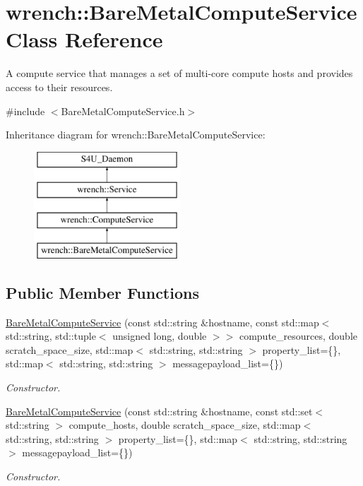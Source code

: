 \hypertarget{classwrench_1_1_bare_metal_compute_service}{}\section{wrench\+:\+:Bare\+Metal\+Compute\+Service Class Reference}
\label{classwrench_1_1_bare_metal_compute_service}


A compute service that manages a set of multi-\/core compute hosts and provides access to their resources.  




{\ttfamily \#include $<$Bare\+Metal\+Compute\+Service.\+h$>$}

Inheritance diagram for wrench\+:\+:Bare\+Metal\+Compute\+Service\+:\begin{figure}[H]
\begin{center}
\leavevmode
\includegraphics[height=4.000000cm]{classwrench_1_1_bare_metal_compute_service}
\end{center}
\end{figure}
\subsection*{Public Member Functions}
\begin{DoxyCompactItemize}
\item 
\hyperlink{classwrench_1_1_bare_metal_compute_service_ad1f0b74b15538742ec16da2f805df662}{Bare\+Metal\+Compute\+Service} (const std\+::string \&hostname, const std\+::map$<$ std\+::string, std\+::tuple$<$ unsigned long, double $>$$>$ compute\+\_\+resources, double scratch\+\_\+space\+\_\+size, std\+::map$<$ std\+::string, std\+::string $>$ property\+\_\+list=\{\}, std\+::map$<$ std\+::string, std\+::string $>$ messagepayload\+\_\+list=\{\})
\begin{DoxyCompactList}\small\item\em Constructor. \end{DoxyCompactList}\item 
\hyperlink{classwrench_1_1_bare_metal_compute_service_a67f03e4100d64ad6921dd65bfd1c8293}{Bare\+Metal\+Compute\+Service} (const std\+::string \&hostname, const std\+::set$<$ std\+::string $>$ compute\+\_\+hosts, double scratch\+\_\+space\+\_\+size, std\+::map$<$ std\+::string, std\+::string $>$ property\+\_\+list=\{\}, std\+::map$<$ std\+::string, std\+::string $>$ messagepayload\+\_\+list=\{\})
\begin{DoxyCompactList}\small\item\em Constructor. \end{DoxyCompactList}\end{DoxyCompactItemize}
